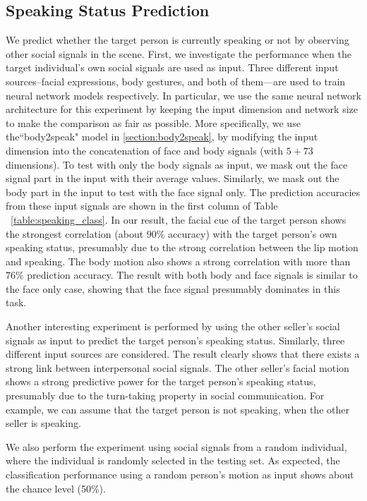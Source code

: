 \subsection{Speaking Status Prediction}
We predict whether the target person is currently speaking or not by observing other social signals in the scene. First, we investigate the performance when the target individual's own social signals are used as input. Three different input sources--facial expressions, body gestures, and both of them---are used to train neural network models respectively. In particular, we use the same neural network architecture for this experiment by keeping the input dimension and network size to make the comparison as fair as possible. More specifically, we use the``body2speak" model in \ref{section:body2speak}, by modifying the input dimension into the concatenation of face and body signals (with $5+73$ dimensions). To test with only the body signals as input, we mask out the face signal part in the input with their average values. Similarly, we mask out the body part in the input to test with the face signal only.  The prediction accuracies from these input signals are shown in the first column of Table ~\ref{table:speaking_class}. In our result, the facial cue of the target person shows the strongest correlation (about $90\%$ accuracy) with the target person's own speaking status, presumably due to the strong correlation between the lip motion and speaking. The body motion also shows a strong correlation with more than $76\%$ prediction accuracy. The result with both body and face signals is similar to the face only case, showing that the face signal presumably dominates in this task.

Another interesting experiment is performed by using the other seller's social signals as input to predict the target person's speaking status. Similarly, three different input sources are considered. The result clearly shows that there exists a strong link between interpersonal social signals. The other seller's facial motion shows a strong predictive power for the target person's speaking status, presumably due to the turn-taking property in social communication. For example, we can assume that the target person is not speaking, when the other seller is speaking.

We also perform the experiment using social signals from a random individual, where the individual is randomly selected in the testing set. As expected, the classification performance using a random person's motion as input shows about the chance level (50\%).

